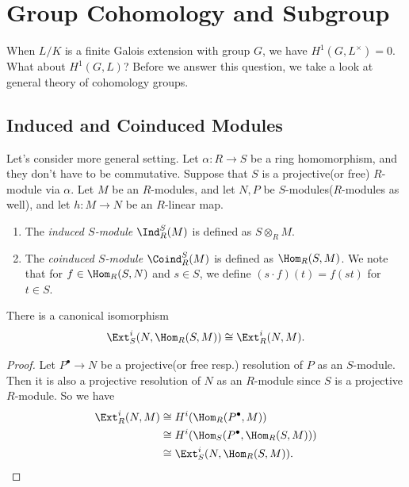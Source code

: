 \newpage
\section{Group Cohomology and Subgroup}
When $L/K$ is a finite Galois extension with group $G$, we have $H^1(G, L^\times) = 0$.
What about $H^1(G, L)$?
Before we answer this question, we take a look at general theory of cohomology groups.

\subsection{Induced and Coinduced Modules}
Let's consider more general setting.
Let $\alpha: R \to S$ be a ring homomorphism, and they don't have to be commutative.
Suppose that $S$ is a projective(or free) $R$-module via $\alpha$.
Let $M$ be an $R$-modules, and let $N, P$ be $S$-modules($R$-modules as well), and let $h: M \to N$ be an $R$-linear map.

\begin{definition}
    \noindent\begin{enumerate}
        \item The \textit{induced $S$-module} $\Ind_R^S(M)$ is defined as $S \otimes_R M$.
        \item The \textit{coinduced $S$-module} $\Coind_R^S(M)$ is defined as $\Hom_R(S, M)$.
        We note that
        for $f \in \Hom_R(S, N)$ and $s \in S$, we define $(s \cdot f)(t) = f(st)$ for $t \in S$.
    \end{enumerate}
\end{definition}

\begin{proposition}
    There is a canonical isomorphism $$\Ext_S^i(N, \Hom_R(S, M)) \cong \Ext_R^i(N, M).$$
\end{proposition}
\begin{proof}
    Let $P^\bullet \to N$ be a projective(or free resp.) resolution of $P$ as an $S$-module.
    Then it is also a projective resolution of $N$ as an $R$-module since $S$ is a projective $R$-module.
    So we have
    \begin{align*}
        \Ext_R^i(N, M) &\cong H^i(\Hom_R(P^\bullet, M)) \\
        &\cong H^i(\Hom_S(P^\bullet, \Hom_R(S, M))) \\
        &\cong \Ext_S^i(N, \Hom_R(S, M)).
    \end{align*}
\end{proof}

